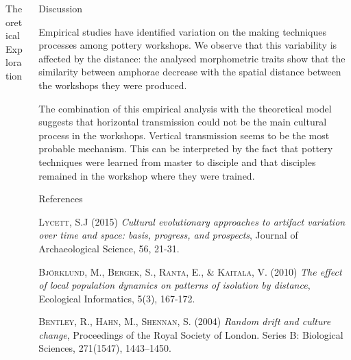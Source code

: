 \documentclass[final]{beamer}
\newcommand{\memo}[2]{\textcolor{#1}{#2}}
\newcommand{\xavi}[1]{\memo{orange}{#1\\}}
\newlength{\sepwid}
\newlength{\onecolwid}
\newlength{\twocolwid}
\begin{document}
\begin{frame}[t]
\begin{columns}[t]
\begin{column}{\twocolwid}
\begin{block}{Theoretical Exploration}
\end{block}
\end{column}



\begin{column}{\onecolwid} %

\begin{block}{Discussion}
\justify

Empirical studies have identified variation on the making techniques processes among pottery workshops. We observe that this variability is affected by the distance: the analysed morphometric traits show that the similarity between amphorae decrease with the spatial distance between the workshops they were produced.

The combination of this empirical analysis with the theoretical model suggests that horizontal transmission could not be the main cultural process in the workshops. Vertical transmission seems to be the most probable mechanism. This can be interpreted by the fact that pottery techniques were learned from master to disciple and that disciples remained in the workshop where they were trained.
 

\end{block}

\begin{block}{References}
\small

\begin{thebibliography}{50}


\textsc{Lycett, S.J (2015)}
\textit{Cultural evolutionary approaches to artifact variation over time and space: basis, progress, and prospects}, Journal of Archaeological Science, 56, 21-31.

\textsc{Bj\"{o}rklund, M., Bergek, S., Ranta, E., \& Kaitala, V. (2010)}
\textit{The effect of local population dynamics on patterns of isolation by distance}, Ecological Informatics, 5(3), 167-172.

\textsc{Bentley, R., Hahn, M., Shennan, S. (2004)}
\textit{Random drift and culture change}, Proceedings of the Royal Society of London. Series B: Biological Sciences, 271(1547), 1443--1450.



\end{thebibliography}
\end{block}
\end{column}
\end{columns}
\end{frame}
\end{document}
